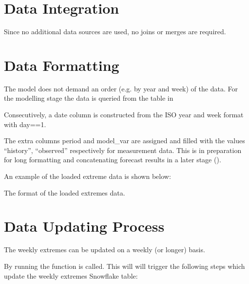 \documentclass[letterpaper,10pt,english]{sphinxmanual}
\let\sphinxpxdimen\pdfpxdimen\else\newdimen\sphinxpxdimen
\begin{document}
\section{Data Integration}
\label{\detokenize{data_preparation:data-integration}}
Since no additional data sources are used, no joins or merges are required.


\section{Data Formatting}
\label{\detokenize{data_preparation:data-formatting}}
The model does not demand an order (e.g. by year and week) of the data.
For the modelling stage the data is queried from the table in {\hyperref[\detokenize{data_preparation:data-construction}]{}}

Consecutively, a date column is constructed from the ISO year and week format with day==1.

The extra columns period and model\_var are assigned and filled with the values “history”, “observed” respectively for measurement data.
This is in preparation for long formatting and concatenating forecast results in a later stage ({\hyperref[\detokenize{autoapi/src/preprocess/preprocess/index:src.preprocess.preprocess.format_data}]{}}).

An example of the loaded extreme data is shown below:

\noindent{\hspace*{\fill}\sphinxincludegraphics[width=800\sphinxpxdimen]{{loaded_extremes}.png}\hspace*{\fill}}

The format of the loaded extremes data.


\section{Data Updating Process}
\label{\detokenize{data_preparation:data-updating-process}}
The weekly extremes can be updated on a weekly (or longer) basis.

By running {\hyperref[\detokenize{autoapi/src/preprocess/update_extremes/index:module-src.preprocess.update_extremes}]{}} the function {\hyperref[\detokenize{autoapi/src/utils/snowflake/index:src.utils.snowflake.update_week_extremes}]{}} is called.
This will will trigger the following steps which update the weekly extremes Snowflake table:
\end{document}
